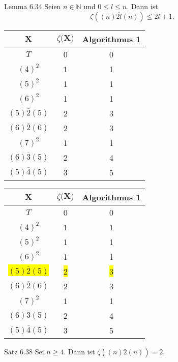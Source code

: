 \documentclass{beamer}
\begin{document}
\begin{frame}
\begin{block}{Lemma 6.34}
Seien $n\in \mathbb{N}$ und $0\leq l \leq n.$ Dann ist 
\[
\zeta((n)\overline{2l}(n))\leq 2l+1.
\]
\end{block}
\end{frame}
\begin{frame}
\begin{center}
\begin{tabular}{|c|c|c|}
\hline

$\textbf{X}$&$\textbf{$\zeta$(X)}$&\textbf{Algorithmus 1}\\
\hline
$T$&0&0\\
\hline
$(4)^2$&1&1\\
\hline
$(5)^2$&1&1\\
\hline
$(6)^2$&1&1\\
\hline
$(5)\overline{2}(5)$&2&3\\
\hline
$(6)\overline{2}(6)$&2&3\\
\hline
$(7)^2$&1&1\\
\hline
$(6)\overline{3}(5)$&2&4\\
\hline
$(5)\overline{4}(5)$&3&5\\
\hline
\end{tabular}
\end{center}

\end{frame}
\begin{frame}
\begin{center}
\begin{tabular}{|c|c|c|}
\hline

$\textbf{X}$&$\textbf{$\zeta$(X)}$&\textbf{Algorithmus 1}\\
\hline
$T$&0&0\\
\hline
$(4)^2$&1&1\\
\hline
$(5)^2$&1&1\\
\hline
$(6)^2$&1&1\\
\hline
\colorbox{yellow}{$(5)\overline{2}(5)$}&\colorbox{yellow}{2}&\colorbox{yellow}{3}\\
\hline
$(6)\overline{2}(6)$&2&3\\
\hline
$(7)^2$&1&1\\
\hline
$(6)\overline{3}(5)$&2&4\\
\hline
$(5)\overline{4}(5)$&3&5\\
\hline
\end{tabular}
\end{center}
\end{frame}
\begin{frame}
\begin{block}{Satz 6.38}
Sei $n \geq 4.$ Dann ist $\zeta((n)\overline{2}(n))=2.$
\end{block}
\end{frame}
\end{document}

